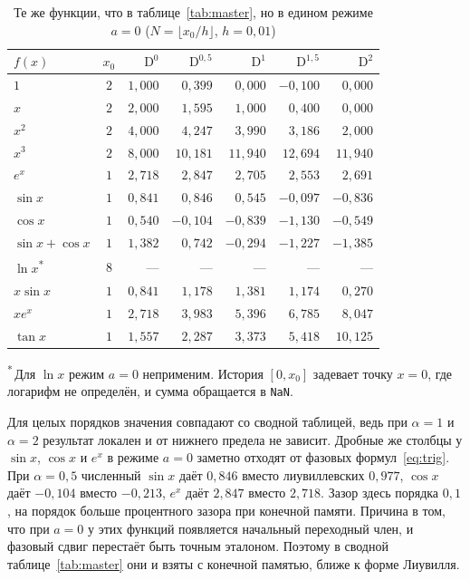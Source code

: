 \documentclass[14pt,a4paper]{extarticle}
\newcommand{\D}{\mathrm{D}}
\begin{document}
\begin{table}[htbp]
\centering
\caption{Те же функции, что в таблице~\ref{tab:master}, но в едином режиме $a=0$ ($N=\lfloor x_0/h\rfloor$, $h=0{,}01$)}
\label{tab:mastera0}
\small
\begin{tabular}{|l|c|r|r|r|r|r|}
\hline
$f(x)$ & $x_0$ & $\D^{0}$ & $\D^{0{,}5}$ & $\D^{1}$ & $\D^{1{,}5}$ & $\D^{2}$ \\
\hline
$1$            & $2$ & $1{,}000$ & $0{,}399$  & $0{,}000$  & $-0{,}100$ & $0{,}000$ \\
\hline
$x$            & $2$ & $2{,}000$ & $1{,}595$  & $1{,}000$  & $0{,}400$  & $0{,}000$ \\
\hline
$x^2$          & $2$ & $4{,}000$ & $4{,}247$  & $3{,}990$  & $3{,}186$  & $2{,}000$ \\
\hline
$x^3$          & $2$ & $8{,}000$ & $10{,}181$ & $11{,}940$ & $12{,}694$ & $11{,}940$ \\
\hline
$e^{x}$        & $1$ & $2{,}718$ & $2{,}847$  & $2{,}705$  & $2{,}553$  & $2{,}691$ \\
\hline
$\sin x$       & $1$ & $0{,}841$ & $0{,}846$  & $0{,}545$  & $-0{,}097$ & $-0{,}836$ \\
\hline
$\cos x$       & $1$ & $0{,}540$ & $-0{,}104$ & $-0{,}839$ & $-1{,}130$ & $-0{,}549$ \\
\hline
$\sin x+\cos x$& $1$ & $1{,}382$ & $0{,}742$  & $-0{,}294$ & $-1{,}227$ & $-1{,}385$ \\
\hline
$\ln x$\textsuperscript{*} & $8$ & --- & --- & --- & --- & --- \\
\hline
$x\sin x$      & $1$ & $0{,}841$ & $1{,}178$  & $1{,}381$  & $1{,}174$  & $0{,}270$ \\
\hline
$xe^{x}$       & $1$ & $2{,}718$ & $3{,}983$  & $5{,}396$  & $6{,}785$  & $8{,}047$ \\
\hline
$\tan x$       & $1$ & $1{,}557$ & $2{,}287$  & $3{,}373$  & $5{,}418$  & $10{,}125$ \\
\hline
\end{tabular}

\vspace{2pt}
{\footnotesize\raggedright\textsuperscript{*}\,Для $\ln x$ режим $a=0$ неприменим. История $[0,x_0]$ задевает точку $x=0$, где логарифм не определён, и сумма обращается в \texttt{NaN}.\par}
\end{table}

Для целых порядков значения совпадают со сводной таблицей, ведь при $\alpha=1$ и $\alpha=2$ результат локален и от нижнего предела не зависит. Дробные же столбцы у $\sin x$, $\cos x$ и $e^x$ в режиме $a=0$ заметно отходят от фазовых формул~\eqref{eq:trig}. При $\alpha=0{,}5$ численный $\sin x$ даёт $0{,}846$ вместо лиувиллевских $0{,}977$, $\cos x$ даёт $-0{,}104$ вместо $-0{,}213$, $e^x$ даёт $2{,}847$ вместо $2{,}718$. Зазор здесь порядка $0{,}1$, на порядок больше процентного зазора при конечной памяти. Причина в том, что при $a=0$ у этих функций появляется начальный переходный член, и фазовый сдвиг перестаёт быть точным эталоном. Поэтому в сводной таблице~\ref{tab:master} они и взяты с конечной памятью, ближе к форме Лиувилля.
\end{document}

